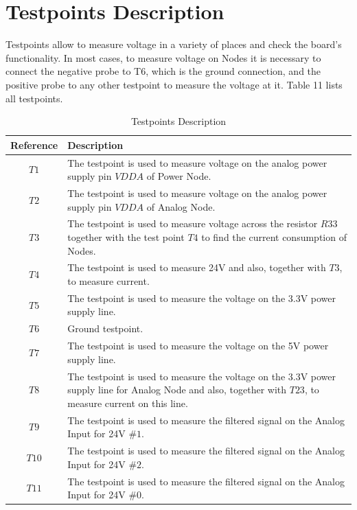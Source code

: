 \documentclass[10pt]{datasheet}
\begin{document}
\section{Testpoints Description}
\label{ssec:testpoint}
Testpoints allow to measure voltage in a variety of places and check the board’s functionality. In most cases, to measure voltage on Nodes it is necessary to connect the negative probe to T6, which is the ground connection, and the positive probe to any other testpoint to measure the voltage at it. Table 11 lists all testpoints.
\begin{table}[H]
\begin{threeparttable}
\caption{Testpoints Description}
\label{table:testpoint_list}
\begin{tabularx}{\textwidth}{ c | X }
    \thickhline
    \textbf{Reference} & \textbf{Description} \\
    \hline
    $T1$ & The testpoint is used to measure voltage on the analog power supply pin $VDDA$ of Power Node.\tnote{1}  \\
    \hline
    $T2$ & The testpoint is used to measure voltage on the analog power supply pin $VDDA$ of Analog Node.\tnote{2} \\
    \hline
    $T3$ & The testpoint is used to measure voltage across the resistor $R33$ together with the test point $T4$ to find the current consumption of Nodes.\tnote{3} \\
    \hline
    $T4$ & The testpoint is used to measure 24V and also, together with $T3$, to measure current.\tnote{3} \\
    \hline
    $T5$ & The testpoint is used to measure the voltage on the 3.3V power supply line.\tnote{3}\\
    \hline
    $T6$ & Ground testpoint.\\
    \hline
    $T7$ & The testpoint is used to measure the voltage on the 5V power supply line.\tnote{3}\\
    \hline
    $T8$ & The testpoint is used to measure the voltage on the 3.3V power supply line for Analog Node and also, together with $T23$, to measure current on this line.\tnote{4} \\
    \hline
    $T9$ & The testpoint is used to measure the filtered signal on the Analog Input for 24V $\#1$.\tnote{5}\\
    \hline
    $T10$ & The testpoint is used to measure the filtered signal on the Analog Input for 24V $\#2$.\tnote{5}\\
    \hline
    $T11$ & The testpoint is used to measure the filtered signal on the Analog Input for 24V $\#0$.\tnote{5} \\

\end{tabularx}
\end{threeparttable}
\end{table}
\end{document}

